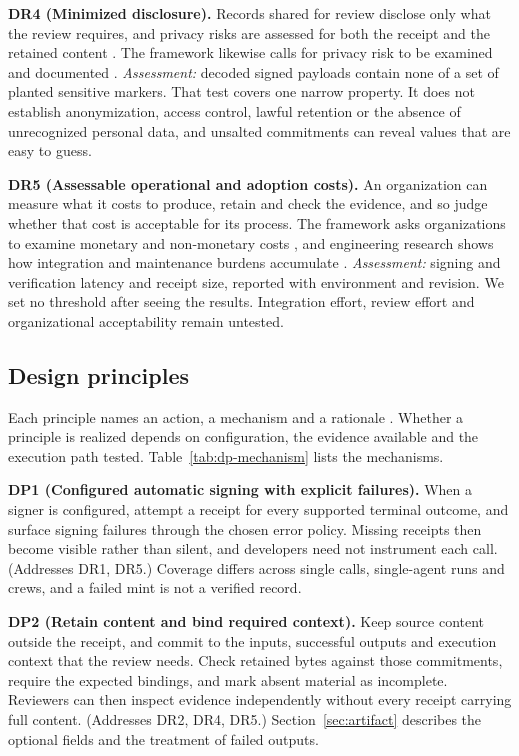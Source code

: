 \documentclass[11pt]{article}
\begin{document}
\textbf{DR4 (Minimized disclosure).} Records shared for review disclose only what the review requires, and privacy risks are assessed for both the receipt and the retained content \citep{felzmann2019}. The framework likewise calls for privacy risk to be examined and documented \citep[MEASURE~2.10]{nist2023}. \emph{Assessment:} decoded signed payloads contain none of a set of planted sensitive markers. That test covers one narrow property. It does not establish anonymization, access control, lawful retention or the absence of unrecognized personal data, and unsalted commitments can reveal values that are easy to guess.

\textbf{DR5 (Assessable operational and adoption costs).} An organization can measure what it costs to produce, retain and check the evidence, and so judge whether that cost is acceptable for its process. The framework asks organizations to examine monetary and non-monetary costs \citep[MAP~3.2]{nist2023}, and engineering research shows how integration and maintenance burdens accumulate \citep{sculley2015,amershi2019}. \emph{Assessment:} signing and verification latency and receipt size, reported with environment and revision. We set no threshold after seeing the results. Integration effort, review effort and organizational acceptability remain untested.

\subsection{Design principles}

Each principle names an action, a mechanism and a rationale \citep{gregor2013}. Whether a principle is realized depends on configuration, the evidence available and the execution path tested. Table~\ref{tab:dp-mechanism} lists the mechanisms.

\textbf{DP1 (Configured automatic signing with explicit failures).} When a signer is configured, attempt a receipt for every supported terminal outcome, and surface signing failures through the chosen error policy. Missing receipts then become visible rather than silent, and developers need not instrument each call. (Addresses DR1, DR5.) Coverage differs across single calls, single-agent runs and crews, and a failed mint is not a verified record.

\textbf{DP2 (Retain content and bind required context).} Keep source content outside the receipt, and commit to the inputs, successful outputs and execution context that the review needs. Check retained bytes against those commitments, require the expected bindings, and mark absent material as incomplete. Reviewers can then inspect evidence independently without every receipt carrying full content. (Addresses DR2, DR4, DR5.) Section~\ref{sec:artifact} describes the optional fields and the treatment of failed outputs.
\end{document}
